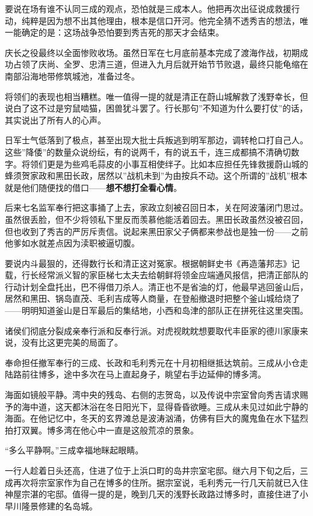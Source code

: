 \documentclass[
]{book}
\begin{document}
要说在场有谁不认同三成的观点，恐怕就是三成本人。他把再次出征说成救援行动，纯粹是因为想不出其他理由，根本是信口开河。他完全猜不透秀吉的想法，唯一能确定的是：这场战争恐怕要到秀吉死的那天才会结束。

庆长之役最终以全面惨败收场。虽然日军在七月底前基本完成了渡海作战，初期成功占领了庆尚、全罗、忠清三道，但进入九月后就开始节节败退，最终只能龟缩在南部沿海地带修筑城池，准备过冬。

将领们的表现也相当糟糕。唯一值得一提的就是清正在蔚山城解救了浅野幸长，但说白了这不过是穷鼠啮猫，困兽犹斗罢了。行长那句''不知道为什么要打仗''的话，其实说出了所有人的心声。

日军士气低落到了极点，甚至出现大批士兵叛逃到明军那边，调转枪口打自己人。这些''降倭''的数量众说纷纭，有的说两千，有的说五千，连三成都搞不清确切数字。将领们更是为些鸡毛蒜皮的小事互相使绊子。比如本应担任先锋救援蔚山城的蜂须贺家政和黑田长政，居然以''战机未到''为由按兵不动。这个所谓的''战机''根本就是他们随便找的借口------\textbf{想不想打全看心情}。

后来七名监军奉行把这事捅了上去，家政立刻被召回日本，关在阿波藩闭门思过。虽然很丢脸，但不少将领私下里反而羡慕他能活着回去。黑田长政虽然没被召回，但也收到了秀吉的严厉斥责信。说起来黑田家父子俩都来参战也是独一份------之前他爹如水就差点因为渎职被逼切腹。

要说内斗最狠的，还得数行长和清正这对冤家。根据朝鲜史书《再造藩邦志》记载，行长经常派义智的家臣梯七太夫去给朝鲜将领金应端通风报信，把清正部队的行动计划全盘托出，巴不得借刀杀人。清正也不是省油的灯，他最早逃回釜山后，居然和黑田、锅岛直茂、毛利吉成等人商量，在登船撤退时把整个釜山城给烧了------明明知道釜山是日军最后的集结地，小西和岛津的部队正在拼死往这里突围。

诸侯们彻底分裂成亲奉行派和反奉行派。对虎视眈眈想要取代丰臣家的德川家康来说，没有比这更完美的局面了。

奉命担任撤军奉行的三成、长政和毛利秀元在十月初相继抵达筑前。三成从小仓走陆路前往博多，途中多次在马上直起身子，眺望右手边延伸的博多湾。

海面如镜般平静。湾中央的残岛、右侧的志贺岛，以及传说中宗室曾向秀吉请求赐予的海中道，这天都沐浴在冬日阳光下，显得昏昏欲睡。三成从未见过如此宁静的海面。在他记忆中，冬天的玄界滩总是波涛汹涌，仿佛有巨大的魔鬼鱼在水下猛烈拍打双翼。博多湾在他心中一直是这般荒凉的景象。

``多么平静啊。''三成幸福地眯起眼睛。

一行人趁着日头还高，住进了位于上浜口町的岛井宗室宅邸。继六月下旬之后，三成再次将宗室家作为自己在博多的住所。据宗室说，毛利秀元一行几天前就已入住神屋宗湛的宅邸。值得一提的是，晚到几天的浅野长政路过博多时，直接住进了小早川隆景修建的名岛城。
\end{document}
